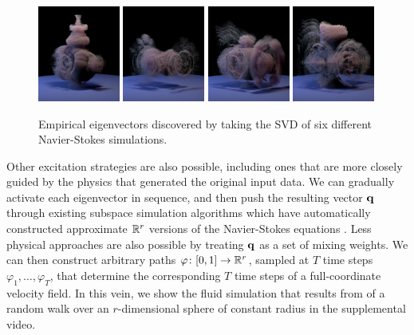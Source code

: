 \documentclass[11pt]{article}
\begin{document}
\begin{figure}
	\includegraphics[width=0.24\textwidth]{Figures/modes/plume0012.png}
	\includegraphics[width=0.24\textwidth]{Figures/modes/plume0013.png}
	\includegraphics[width=0.24\textwidth]{Figures/modes/plume0014.png}
	\includegraphics[width=0.24\textwidth]{Figures/modes/plume0015.png}
	\caption{Empirical eigenvectors discovered by taking the SVD of six different Navier-Stokes simulations.}
	\label{fig:eigs}
\end{figure}

Other excitation strategies are also possible, including ones that are more closely guided by the physics that generated the original input data. We can gradually activate each eigenvector in sequence, and then push the resulting vector $\mathbf{q}$ through existing subspace simulation algorithms which have automatically constructed approximate $\mathbb{R}^r$ versions of the Navier-Stokes equations \cite{Kim2013}. Less physical approaches are also possible by treating $\mathbf{q}$ as a set of mixing weights. We can then construct arbitrary paths $\varphi \colon [0, 1] \rightarrow \mathbb{R}^r$, sampled at $T$ time steps $\varphi_1, \ldots, \varphi_T$, that determine the corresponding $T$ time steps of a full-coordinate velocity field. In this vein, we show the fluid simulation that results from of a random walk over an $r$-dimensional sphere of constant radius in the supplemental video. %
\end{document}
